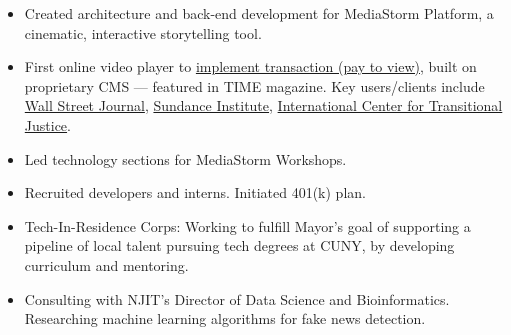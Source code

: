 \documentclass[a4paper,10pt]{memoir} %
\begin{document}
\begin{itemize}
	\item Created architecture and back-end development for MediaStorm 
	Platform, a cinematic, interactive storytelling tool. 
	
	\item First online video player to \href{http://time.com/46716/game-changer-mediastorm-launches-pay-per-story-video-player/}{implement 
	transaction (pay to view)}, built on proprietary CMS --- featured in 
	TIME magazine. Key users/clients include \href{https://mediastorm.com/clients/2018-icp-infinity-awards}{Wall Street Journal}, \href{https://mediastorm.com/clients/sundance-short-film-challenge}{Sundance 
	Institute}, \href{https://mediastorm.com/clients/i-am-not-who-they-think-i-am-for-ictj}{International Center for 
	Transitional Justice}. 
	
	\item Led technology sections for MediaStorm Workshops.
	
	\item Recruited developers and interns. Initiated 401(k) plan.
\end{itemize}
\Sep %


\clearpage %
\userinformation %
\framebreak %

\begin{itemize}
	\item Tech-In-Residence Corps: Working to fulfill Mayor's goal of 
	supporting a pipeline of local talent pursuing tech degrees at CUNY, by 
	developing curriculum and mentoring.

	\item Consulting with NJIT's Director of Data Science and 
	Bioinformatics. Researching machine learning algorithms for fake news 
	detection.
\end{itemize}

\Sep %
\end{document}
